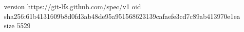 version https://git-lfs.github.com/spec/v1
oid sha256:61b4131609b8d0fd3ab48de95a951568623139cafaefe3cd7c89ab413970e1ea
size 5529
